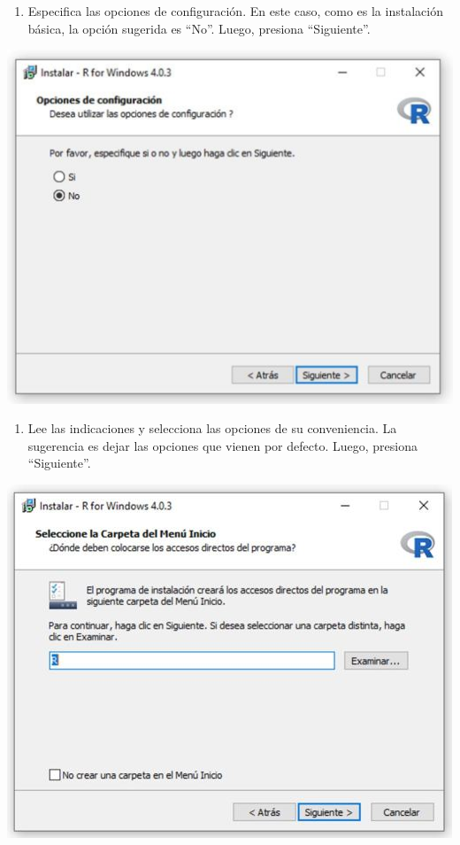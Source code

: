 \documentclass[
]{book}
\providecommand{\tightlist}{%
  \setlength{\itemsep}{0pt}\setlength{\parskip}{0pt}}
\begin{document}
\begin{enumerate}
\def\labelenumi{\arabic{enumi}.}
\setcounter{enumi}{10}
\tightlist
\item
  Especifica las opciones de configuración. En este caso, como es la instalación básica, la opción sugerida es ``No''. Luego, presiona ``Siguiente''.
\end{enumerate}

\includegraphics{data/11.jpg}

\begin{enumerate}
\def\labelenumi{\arabic{enumi}.}
\setcounter{enumi}{11}
\tightlist
\item
  Lee las indicaciones y selecciona las opciones de su conveniencia. La sugerencia es dejar las opciones que vienen por defecto. Luego, presiona ``Siguiente''.
\end{enumerate}

\includegraphics{data/12.jpg}
\end{document}
